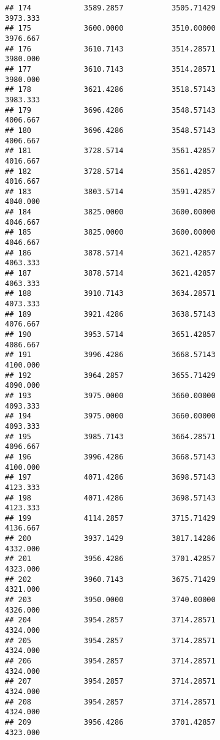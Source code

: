 \documentclass[]{article}
\begin{document}
\begin{verbatim}
## 174            3589.2857           3505.71429                3973.333
## 175            3600.0000           3510.00000                3976.667
## 176            3610.7143           3514.28571                3980.000
## 177            3610.7143           3514.28571                3980.000
## 178            3621.4286           3518.57143                3983.333
## 179            3696.4286           3548.57143                4006.667
## 180            3696.4286           3548.57143                4006.667
## 181            3728.5714           3561.42857                4016.667
## 182            3728.5714           3561.42857                4016.667
## 183            3803.5714           3591.42857                4040.000
## 184            3825.0000           3600.00000                4046.667
## 185            3825.0000           3600.00000                4046.667
## 186            3878.5714           3621.42857                4063.333
## 187            3878.5714           3621.42857                4063.333
## 188            3910.7143           3634.28571                4073.333
## 189            3921.4286           3638.57143                4076.667
## 190            3953.5714           3651.42857                4086.667
## 191            3996.4286           3668.57143                4100.000
## 192            3964.2857           3655.71429                4090.000
## 193            3975.0000           3660.00000                4093.333
## 194            3975.0000           3660.00000                4093.333
## 195            3985.7143           3664.28571                4096.667
## 196            3996.4286           3668.57143                4100.000
## 197            4071.4286           3698.57143                4123.333
## 198            4071.4286           3698.57143                4123.333
## 199            4114.2857           3715.71429                4136.667
## 200            3937.1429           3817.14286                4332.000
## 201            3956.4286           3701.42857                4323.000
## 202            3960.7143           3675.71429                4321.000
## 203            3950.0000           3740.00000                4326.000
## 204            3954.2857           3714.28571                4324.000
## 205            3954.2857           3714.28571                4324.000
## 206            3954.2857           3714.28571                4324.000
## 207            3954.2857           3714.28571                4324.000
## 208            3954.2857           3714.28571                4324.000
## 209            3956.4286           3701.42857                4323.000

\end{verbatim}
\end{document}
